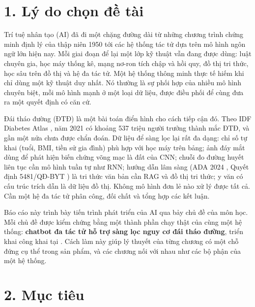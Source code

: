 
\renewcommand{\thetable}{MĐ.\arabic{table}}\renewcommand{\thefigure}{MĐ.\arabic{figure}}

\section*{1. Lý do chọn đề tài}

Trí tuệ nhân tạo (AI) đã đi một chặng đường dài từ những chương trình chứng minh định lý của thập niên 1950 tới các hệ thống tác tử dựa trên mô hình ngôn ngữ lớn hiện nay. Mỗi giai đoạn để lại một lớp kỹ thuật vẫn đang được dùng: luật chuyên gia, học máy thống kê, mạng nơ-ron tích chập và hồi quy, đồ thị tri thức, học sâu trên đồ thị và hệ đa tác tử. Một hệ thống thông minh thực tế hiếm khi chỉ dùng một kỹ thuật duy nhất. Nó thường là sự phối hợp của nhiều mô hình chuyên biệt, mỗi mô hình mạnh ở một loại dữ liệu, được điều phối để cùng đưa ra một quyết định có căn cứ.

Đái tháo đường (ĐTĐ) là một bài toán điển hình cho cách tiếp cận đó. Theo IDF Diabetes Atlas \cite{idf2021}, năm 2021 có khoảng 537 triệu người trưởng thành mắc ĐTĐ, và gần một nửa chưa được chẩn đoán. Dữ liệu để sàng lọc lại rất đa dạng: chỉ số tự khai (tuổi, BMI, tiền sử gia đình) phù hợp với học máy trên bảng; ảnh đáy mắt dùng để phát hiện biến chứng võng mạc là đất của CNN; chuỗi đo đường huyết liên tục cần mô hình tuần tự như RNN; hướng dẫn lâm sàng (ADA 2024 \cite{ada2024}, Quyết định 5481/QĐ-BYT \cite{byt5481}) là tri thức văn bản cần RAG và đồ thị tri thức; y văn có cấu trúc trích dẫn là dữ liệu đồ thị. Không mô hình đơn lẻ nào xử lý được tất cả. Cần một hệ đa tác tử phân công, đối chất và tổng hợp các kết luận.

Báo cáo này trình bày tiến trình phát triển của AI qua bảy chủ đề của môn học. Mỗi chủ đề được kiểm chứng bằng một thành phần chạy thật của cùng một hệ thống: \textbf{chatbot đa tác tử hỗ trợ sàng lọc nguy cơ đái tháo đường}, triển khai công khai tại \href{https://\deploydomain}{\texttt{\deploydomain}}. Cách làm này giúp lý thuyết của từng chương có một chỗ đứng cụ thể trong sản phẩm, và các chương nối với nhau như các bộ phận của một hệ thống.

\section*{2. Mục tiêu}

